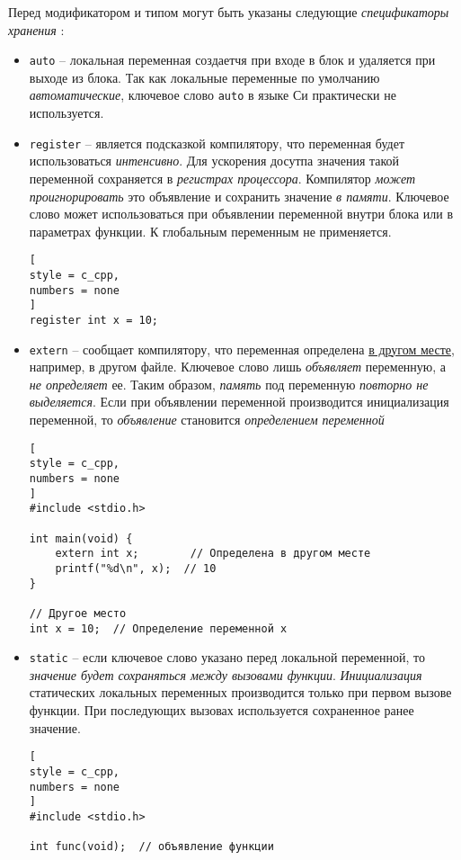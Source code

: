 \documentclass[%
	11pt,
	a4paper,
	utf8,
		]{article}
\begin{document}
Перед модификатором и типом могут быть указаны следующие \emph{спецификаторы хранения} \cite[]{prokhorenok-prog-c:2020}:
\begin{itemize}
	\item \verb*|auto| -- локальная переменная создаетчя при входе в блок и удаляется при выходе из блока. Так как локальные переменные по умолчанию \emph{автоматические}, ключевое слово \verb|auto| в языке Си практически не используется.
	
	\item \verb*|register| -- является подсказкой компилятору, что переменная будет использоваться \emph{интенсивно}. Для ускорения досутпа значения такой переменной сохраняется в \emph{регистрах процессора}. Компилятор \emph{может проигнорировать} это объявление и сохранить значение \emph{в памяти}. Ключевое слово может использоваться при объявлении переменной внутри блока или в параметрах функции. К глобальным переменным не применяется.
\begin{lstlisting}[
style = c_cpp,
numbers = none
]
register int x = 10;
\end{lstlisting}
    \item \verb|extern| -- сообщает компилятору, что переменная определена \underline{в другом месте}, например, в другом файле. Ключевое слово лишь \emph{объявляет} переменную, а \emph{не определяет} ее. Таким образом, \emph{память} под переменную \emph{повторно не выделяется}. Если при объявлении переменной производится инициализация переменной, то \emph{объявление}  становится \emph{определением переменной}
\begin{lstlisting}[
style = c_cpp,
numbers = none
]
#include <stdio.h>

int main(void) {
    extern int x;        // Определена в другом месте
    printf("%d\n", x);  // 10
}

// Другое место
int x = 10;  // Определение переменной x
\end{lstlisting}
    \item \verb*|static| -- если ключевое слово указано перед локальной переменной, то \emph{значение будет сохраняться между вызовами функции}. \emph{Инициализация} статических локальных переменных производится только при первом вызове функции. При последующих вызовах используется сохраненное ранее значение.
\begin{lstlisting}[
style = c_cpp,
numbers = none
]
#include <stdio.h>

int func(void);  // объявление функции


\end{lstlisting}
\end{itemize}
\end{document}

